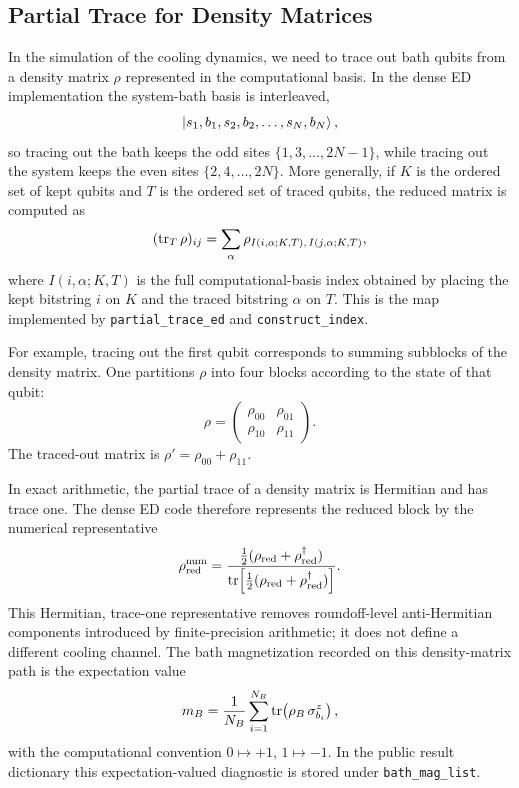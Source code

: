 \documentclass[aps,prx,twocolumn,superscriptaddress,nofootinbib,nolongbibliography,nobalancelastpage,10pt,floatfix]{revtex4-2}
\begin{document}
\subsection{Partial Trace for Density Matrices}

In the simulation of the cooling dynamics, we need to trace out bath qubits
from a density matrix \(\rho\) represented in the computational basis.  In the
dense ED implementation the system-bath basis is interleaved,
\[
    \ket{s_1,b_1,s_2,b_2,\ldots,s_N,b_N},
\]
so tracing out the bath keeps the odd sites
\(\{1,3,\ldots,2N-1\}\), while tracing out the system keeps the even sites
\(\{2,4,\ldots,2N\}\).  More generally, if \(K\) is the ordered set of kept
qubits and \(T\) is the ordered set of traced qubits, the reduced matrix is
computed as
\begin{equation}
    (\operatorname{tr}_T \rho)_{ij}
    =
    \sum_{\alpha}
    \rho_{I(i,\alpha;K,T),\, I(j,\alpha;K,T)} ,
    \label{eq:ed_partial_trace_index}
\end{equation}
where \(I(i,\alpha;K,T)\) is the full computational-basis index obtained by
placing the kept bitstring \(i\) on \(K\) and the traced bitstring \(\alpha\)
on \(T\).  This is the map implemented by
\texttt{partial\_trace\_ed} and \texttt{construct\_index}.

For example, tracing out the first qubit corresponds to summing subblocks of
the density matrix.  One partitions \(\rho\) into four blocks according to the
state of that qubit:
\begin{equation}
    \rho = \begin{pmatrix} \rho_{00} & \rho_{01} \\ \rho_{10} & \rho_{11} \end{pmatrix}.
\end{equation}
The traced-out matrix is \(\rho'=\rho_{00}+\rho_{11}\).

In exact arithmetic, the partial trace of a density matrix is Hermitian and
has trace one.  The dense ED code therefore represents the reduced block by
the numerical representative
\begin{equation}
    \rho_{\mathrm{red}}^{\mathrm{num}}
    =
    \frac{\frac12(\rho_{\mathrm{red}}+\rho_{\mathrm{red}}^\dagger)}
         {\operatorname{tr}\!\left[\frac12(\rho_{\mathrm{red}}+\rho_{\mathrm{red}}^\dagger)\right]} .
    \label{eq:ed_reduced_density_canonicalization}
\end{equation}
This Hermitian, trace-one representative removes roundoff-level
anti-Hermitian components introduced by finite-precision arithmetic; it does
not define a different cooling channel.
The bath magnetization recorded on this density-matrix path is the
expectation value
\begin{equation}
    m_B=\frac{1}{N_B}\sum_{i=1}^{N_B}
    \operatorname{tr}\!\left(\rho_B\,\sigma^z_{b_i}\right),
    \label{eq:ed_bath_magnetization_expectation}
\end{equation}
with the computational convention \(0\mapsto +1\), \(1\mapsto -1\).  In the
public result dictionary this expectation-valued diagnostic is stored under
\texttt{bath\_mag\_list}.
\end{document}
